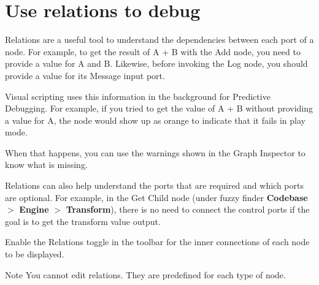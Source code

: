 \chapter{Use relations to debug}
\hypertarget{md__hey_tea_9_2_library_2_package_cache_2com_8unity_8visualscripting_0d1_88_80_2_documentation_0i_2vs-relations}{}\label{md__hey_tea_9_2_library_2_package_cache_2com_8unity_8visualscripting_0d1_88_80_2_documentation_0i_2vs-relations}
\label{md__hey_tea_9_2_library_2_package_cache_2com_8unity_8visualscripting_0d1_88_80_2_documentation_0i_2vs-relations_autotoc_md5554}%
%
 Relations are a useful tool to understand the dependencies between each port of a node. For example, to get the result of A + B with the Add node, you need to provide a value for A and B. Likewise, before invoking the Log node, you should provide a value for its Message input port.



Visual scripting uses this information in the background for Predictive Debugging. For example, if you tried to get the value of A + B without providing a value for A, the node would show up as orange to indicate that it fails in play mode.



When that happens, you can use the warnings shown in the Graph Inspector to know what is missing.

Relations can also help understand the ports that are required and which ports are optional. For example, in the Get Child node (under fuzzy finder {\bfseries{Codebase}} \texorpdfstring{$>$}{>} {\bfseries{ Engine}} \texorpdfstring{$>$}{>} {\bfseries{Transform}}), there is no need to connect the control ports if the goal is to get the transform value output.

Enable the Relations toggle in the toolbar for the inner connections of each node to be displayed.

\begin{DoxyNote}{Note}
You cannot edit relations. They are predefined for each type of node. 
\end{DoxyNote}
